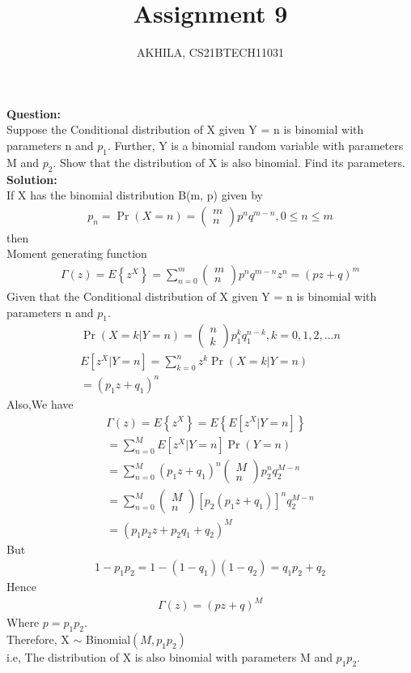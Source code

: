 \documentclass[journal,12pt,twocolumn]{IEEEtran}
\title{Assignment 9}
\author{AKHILA, CS21BTECH11031}
\newcommand{\question}{\noindent \textbf{Question: }}
\newcommand{\solution}{\noindent \textbf{Solution: }}
\providecommand{\cbrak}[1]{\ensuremath{\left\{#1\right\}}}
\providecommand{\brak}[1]{\ensuremath{\left(#1\right)}}
\providecommand{\pr}[1]{\ensuremath{\Pr\left(#1\right)}}
\newcommand{\myvec}[1]{\ensuremath{\begin{pmatrix}#1\end{pmatrix}}}
\begin{document}
\maketitle
\question\\
Suppose the Conditional distribution of X given Y = n is binomial with parameters n and 
$p_1$. Further, Y is a binomial random variable with parameters M and $p_2$. Show that the 
distribution of X is also binomial. Find its parameters.\\ 

\solution\\
If X has the binomial distribution B(m, p) given by 
\begin{align}
    p_n = \pr{X=n} = \myvec{m \\ n}p^nq^{m-n},0\leq n\leq m
\end{align}
then\\ 
Moment generating function
\begin{align}
    \Gamma(z)=E\cbrak{z^{X}} = \sum_{n=0}^m  \myvec{m \\ n}p^nq^{m-n}z^n=(pz+q)^m 
\end{align}
Given that the Conditional distribution of X given Y = n is binomial with parameters n and 
$p_1$.
\begin{multline}
\pr{X=k|Y=n}=\myvec{n \\ k}p_1^kq_1^{n-k} ,k=0,1,2,\dots n\\
E[z^{X}|Y=n]=\sum_{k=0}^n z^{k}\pr{X=k|Y=n}\\=\brak{p_1 z+q_1}^n
\end{multline}
Also,We have
\begin{align}
\Gamma(z)=E\cbrak{z^{X}}=E\cbrak{E[z^{X}|Y=n]}\\
=\sum_{n=0}^M E[z^{X}|Y=n]\pr{Y=n}\\
=\sum_{n=0}^M \brak{p_1 z+q_1}^n \myvec{M \\ n}p_2^nq_2^{M-n}\\
=\sum_{n=0}^M\myvec{M \\ n}[p_2\brak{p_1 z+q_1}]^n q_2^{M-n}\\
=\brak{{p_1p_2 z+p_2q_1+q_2}}^M
\end{align}
But
\begin{align}
1-p_1p_2 = 1-\brak{1-q_1}\brak{1-q_2} = q_1p_2+q_2
\end{align}
Hence
\begin{align}
\Gamma(z)=\brak{pz+q}^M
\end{align}
Where $p=p_1p_2$.\\ Therefore,
X $\sim$ Binomial$\brak{M,p_1p_2}$ \\i.e,
The distribution of X is also binomial with parameters M and $p_1p_2$.
\end{document}
